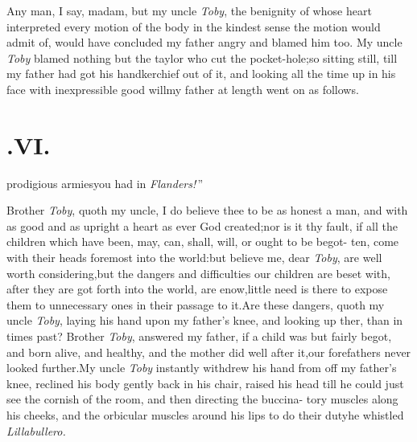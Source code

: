\documentclass{article}
\begin{document}
Any man, I say, madam, but my uncle \textit{Toby}, the benignity of whose heart
interpreted every motion of the body in the kindest sense the motion would admit of,
would have concluded my father angry and blamed him too. My uncle \textit{Toby}
blamed nothing but the taylor who cut the pocket-hole;\tsh so sitting still, till
my father had got his handkerchief out of it, and looking all the time up in his face
with inexpressible good will\tsh my father at length went on as follows.

\section{.\quad  VI.}

prodigious armies\break you had in \textit{Flanders!}\,”

\tsh Brother \textit{Toby}, quoth my uncle\sic,\break
I do believe thee to be as honest a man,\break
and with as good and as upright a heart\break
as ever God created;\tsh nor is it thy\break
fault, if all the children which have been,\break
may, can, shall, will, or ought to be begot-\break
ten, come with their heads foremost into\break
the world:\tsh but believe me, dear \textit{Toby},\break
{}
are well worth considering,\tsh but the dangers and difficulties
our children are beset with, after they are got forth into the
world, are enow,\tsk little need is there to expose them to
unnecessary ones in their passage to it.\tsk Are these dangers,
quoth my uncle \textit{Toby}, laying his hand upon my father’s
knee, and looking up   ther, than in times past? Brother \textit{Toby}, answered
my father, if a child was but fairly begot, and born alive, and
healthy, and the mother did well after it,\tsk our forefathers
never looked further.\tsh My uncle \textit{Toby} instantly
withdrew his hand from off my father’s knee, reclined his body
gently back in his chair, raised his head till he could just see
the cornish of the room, and then directing the
buccina-\break
tory muscles along his cheeks, and the 
orbicular muscles around his lips to do their duty\tsk he
whistled \textit{Lillabullero.}
\end{document}
